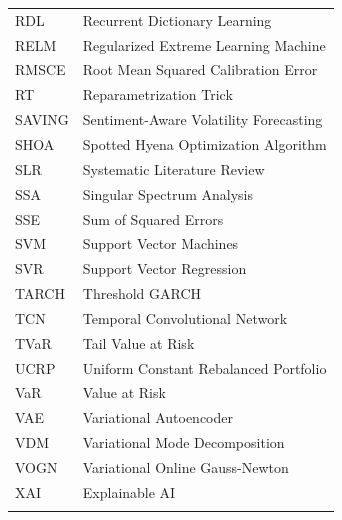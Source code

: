 \begin{table}[H]
\begin{subtable}[t]{0.49\textwidth}
\begin{tabular}{lp{}}
        RDL & Recurrent Dictionary Learning \\
        RELM & Regularized Extreme Learning Machine \\
        RMSCE & Root Mean Squared Calibration Error \\
        RT & Reparametrization Trick \\
        SAVING & Sentiment-Aware Volatility Forecasting \\
        SHOA & Spotted Hyena Optimization Algorithm \\
        SLR & Systematic Literature Review \\
        SSA & Singular Spectrum Analysis \\
        SSE & Sum of Squared Errors \\
        SVM & Support Vector Machines \\
        SVR & Support Vector Regression \\
        TARCH & Threshold GARCH \\
        TCN & Temporal Convolutional Network \\
        TVaR & Tail Value at Risk \\
        UCRP & Uniform Constant Rebalanced Portfolio \\
        VaR & Value at Risk \\
        VAE & Variational Autoencoder \\
        VDM & Variational Mode Decomposition \\
        VOGN & Variational Online Gauss-Newton \\
        XAI & Explainable AI \\
        & \\
        \bottomrule
        \end{tabular}
    \end{subtable}
\end{table}



